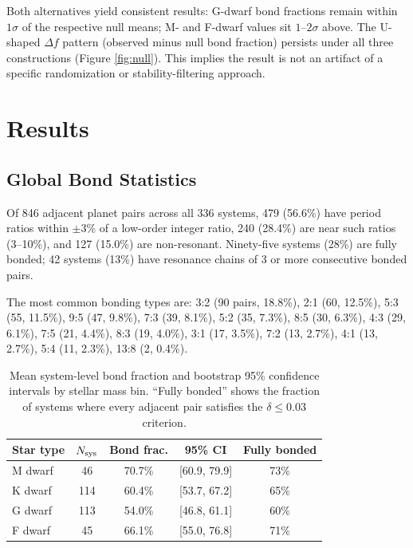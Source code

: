 \documentclass[twocolumn,usenatbib]{mnras}
\begin{document}
Both alternatives yield consistent results: G-dwarf bond fractions remain
within $1\sigma$ of the respective null means; M- and F-dwarf values sit
$1$--$2\sigma$ above. The U-shaped $\Delta f$ pattern (observed minus null
bond fraction) persists under all three constructions (Figure
\ref{fig:null}). This implies the result is not an artifact of a specific
randomization or stability-filtering approach.

\section{Results}
\label{sec:results}

\subsection{Global Bond Statistics}

Of 846 adjacent planet pairs across all 336 systems, 479 (56.6\%) have period
ratios within $\pm 3\%$ of a low-order integer ratio, 240 (28.4\%) are near
such ratios (3--10\%), and 127 (15.0\%) are non-resonant. Ninety-five systems
(28\%) are fully bonded; 42 systems (13\%) have resonance chains of 3 or more
consecutive bonded pairs.

The most common bonding types are: 3:2 (90 pairs, 18.8\%), 2:1 (60, 12.5\%),
5:3 (55, 11.5\%), 9:5 (47, 9.8\%), 7:3 (39, 8.1\%), 5:2 (35, 7.3\%),
8:5 (30, 6.3\%), 4:3 (29, 6.1\%), 7:5 (21, 4.4\%), 8:3 (19, 4.0\%),
3:1 (17, 3.5\%), 7:2 (13, 2.7\%), 4:1 (13, 2.7\%), 5:4 (11, 2.3\%),
13:8 (2, 0.4\%).

\begin{table}
\centering
\caption{Mean system-level bond fraction and bootstrap 95\% confidence
intervals by stellar mass bin. ``Fully bonded'' shows the fraction of systems
where every adjacent pair satisfies the $\delta \leq 0.03$ criterion.}
\label{tab:ushape}
\begin{tabular}{lcccc}
\hline
Star type & $N_{\rm sys}$ & Bond frac. & 95\% CI & Fully bonded\\
\hline
M dwarf & 46 & 70.7\% & [60.9, 79.9] & 73\%\\
K dwarf & 114 & 60.4\% & [53.7, 67.2] & 65\%\\
G dwarf & 113 & 54.0\% & [46.8, 61.1] & 60\%\\
F dwarf & 45 & 66.1\% & [55.0, 76.8] & 71\%\\
\hline
\end{tabular}
\end{table}
\end{document}
